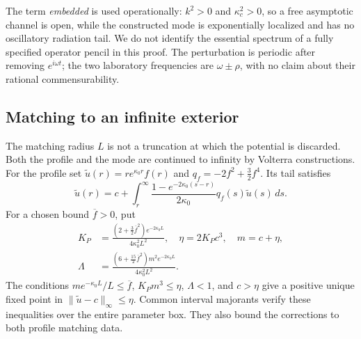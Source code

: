 The term \emph{embedded} is used operationally: $k^2>0$ and
$\kappa_c^2>0$, so a free asymptotic channel is open, while the constructed
mode is exponentially localized and has no oscillatory radiation tail.
We do not identify the essential spectrum of a fully specified operator
pencil in this proof. The perturbation is periodic after removing
$e^{i\omega t}$; the two laboratory frequencies are $\omega\pm\rho$,
with no claim about their rational commensurability.

\subsection{Matching to an infinite exterior}
\label{sec:proof-tails}
The matching radius $L$ is not a truncation at which the potential is
discarded. Both the profile and the mode are continued to infinity by
Volterra constructions. For the profile set
$\widetilde u(r)=r e^{\kappa_0r}f(r)$ and
$q_f=-2f^2+\tfrac32 f^4$. Its tail satisfies
\begin{equation}
 \widetilde u(r)=c+
 \int_r^\infty\frac{1-e^{-2\kappa_0(s-r)}}{2\kappa_0}
                q_f(s)\widetilde u(s)\,ds.
 \label{eq:proof-profile-volterra}
\end{equation}
For a chosen bound $\overline f>0$, put
\begin{equation}
 \begin{aligned}
 K_P&=\frac{(2+\tfrac32\overline f^2)e^{-2\kappa_0L}}
                  {4\kappa_0^2L^2},\quad
 \eta=2K_Pc^3,\quad m=c+\eta,\\
 \Lambda&=\frac{(6+\tfrac{15}{2}\overline f^2)m^2e^{-2\kappa_0L}}
                     {4\kappa_0^2L^2}.
 \end{aligned}
 \label{eq:proof-profile-constants}
\end{equation}
The conditions $m e^{-\kappa_0L}/L\leq\overline f$,
$K_Pm^3\leq\eta$, $\Lambda<1$, and $c>\eta$ give a positive unique
fixed point in $\|\widetilde u-c\|_\infty\leq\eta$. Common interval
majorants verify these inequalities over the entire parameter box.
They also bound the corrections to both profile matching data.

